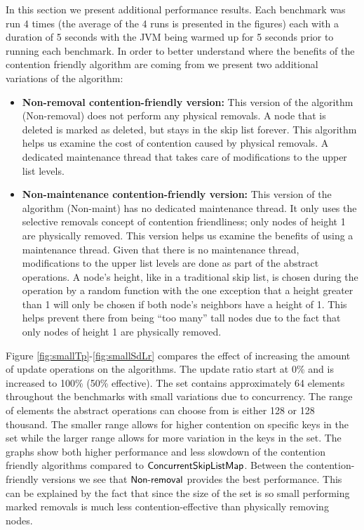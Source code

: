 In this section we present additional performance results.
Each benchmark was run 4 times (the average of the 4 runs is presented in the figures) each with a duration of 5 seconds with the JVM being warmed up for 5 seconds prior to running each benchmark.
In order to better understand where the benefits of the contention friendly algorithm are coming from
we present two additional variations of the algorithm:
\begin{itemize}
\item {\bf Non-removal contention-friendly version:} This version of the algorithm (Non-removal) does not perform any physical removals.
A node that is deleted is marked as deleted, but stays in the skip list forever.
This algorithm helps us examine the cost of contention caused by physical removals.
A dedicated maintenance thread that takes care of 
modifications to the upper list levels. 
\item {\bf Non-maintenance contention-friendly version:} This version of the algorithm (Non-maint) has no dedicated maintenance thread.
It only uses the selective removals concept of contention friendliness; only nodes of height 1 are physically removed.
This version helps us examine the benefits of using a maintenance thread.
Given that there is no maintenance thread, modifications to the upper list levels are done as part of the abstract operations.
A node's height, like in a traditional skip list, is chosen during the  operation by a random function with the one exception
that a height greater than 1 will only be chosen
if both node's neighbors have a height of 1.
This helps prevent there from being ``too many'' tall nodes due to the fact that only nodes of height 1 are physically removed.
\end{itemize}


Figure \ref{fig:smallTp}-\ref{fig:smallSdLr} compares the effect of increasing the amount of update operations on the algorithms.
The update ratio start at 0\% and is increased to 100\% (50\% effective).
The set contains approximately 64 elements throughout the benchmarks with small variations due to concurrency.
The range of elements the abstract operations can choose from is either 128 or 128 thousand.
The smaller range allows for higher contention on specific keys in the set while the larger range allows for more
variation in the keys in the set.
The graphs show both higher performance and less slowdown of the contention friendly algorithms compared to $\lit{ConcurrentSkipListMap}$.
Between the contention-friendly versions we see that $\lit{Non-removal}$ provides the best performance.
This can be explained by the fact that since the size of the set is so small performing marked removals is much less contention-effective
than physically removing nodes.

